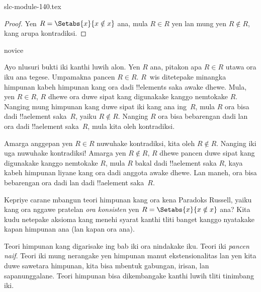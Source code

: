 \begin{filecontents*}[overwrite]{slc-module-140.tex}
\begin{proof}
Yen $R = \Setabs{x}{x \notin x}$ ana, mula
$R \in R$ yen lan mung yen $R \notin R$, kang arupa kontradiksi.
\end{proof}

\begin{tagblock}{novice}
\begin{explain}
Ayo nlusuri bukti iki kanthi luwih alon. Yen $R$ ana,
pitakon apa $R \in R$ utawa ora iku ana tegese.
Umpamakna pancen $R \in R$. $R$~wis ditetepake minangka
himpunan kabeh himpunan kang ora dadi !!{element}s saka
awake dhewe. Mula, yen $R \in R$, $R$ dhewe ora duwe
sipat kang digunakake kanggo nemtokake $R$.
Nanging mung himpunan kang duwe sipat iki kang ana ing~$R$,
mula $R$ ora bisa dadi !!a{element} saka~$R$,
yaiku $R \notin R$. Nanging $R$ ora bisa bebarengan dadi
lan ora dadi !!a{element} saka~$R$, mula kita oleh kontradiksi.

Amarga anggepan yen $R \in R$ nuwuhake kontradiksi,
kita oleh $R \notin R$. Nanging iki uga nuwuhake kontradiksi!{}
Amarga yen $R\notin R$, $R$ dhewe pancen duwe sipat kang
digunakake kanggo nemtokake $R$, mula $R$ bakal dadi
!!a{element} saka $R$, kaya kabeh himpunan liyane kang
ora dadi anggota awake dhewe.
Lan maneh, ora bisa bebarengan ora dadi lan dadi
!!a{element} saka~$R$.
\end{explain}
\end{tagblock}

\begin{digress}
Kepriye carane mbangun teori himpunan kang ora kena Paradoks
Russell, yaiku kang ora nggawe pratelan \emph{ora konsisten}
yen $R = \Setabs{x}{x \notin x}$ ana?
Kita kudu netepake aksioma kang menehi syarat kanthi tliti banget
kanggo nyatakake kapan himpunan ana (lan kapan ora ana).

Teori himpunan kang digarisake ing bab iki ora nindakake iku.
Teori iki \emph{pancen naif}. Teori iki mung nerangake yen
himpunan manut ekstensionalitas lan yen kita duwe sawetara
himpunan, kita bisa mbentuk gabungan, irisan, lan sapanunggalane.
Teori himpunan bisa dikembangake kanthi luwih tliti tinimbang iki.
\end{digress}



\end{filecontents*}

